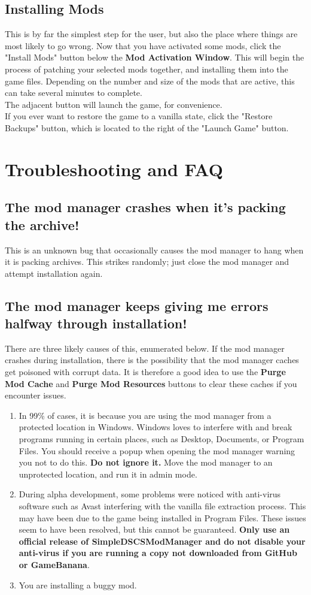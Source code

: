 \documentclass{article}
\begin{document}
\subsection{Installing Mods}
This is by far the simplest step for the user, but also the place where things are most likely to go wrong. Now that you have activated some mods, click the "Install Mods" button below the \textbf{Mod Activation Window}. This will begin the process of patching your selected mods together, and installing them into the game files. Depending on the number and size of the mods that are active, this can take several minutes to complete.\\
The adjacent button will launch the game, for convenience.\\
If you ever want to restore the game to a vanilla state, click the "Restore Backups" button, which is located to the right of the "Launch Game" button.

\newpage
\section{Troubleshooting and FAQ}
\subsection{The mod manager crashes when it's packing the archive!}
This is an unknown bug that occasionally causes the mod manager to hang when it is packing archives. This strikes randomly; just close the mod manager and attempt installation again.

\subsection{The mod manager keeps giving me errors halfway through installation!}
There are three likely causes of this, enumerated below. If the mod manager crashes during installation, there is the possibility that the mod manager caches get poisoned with corrupt data. It is therefore a good idea to use the \textbf{Purge Mod Cache} and \textbf{Purge Mod Resources} buttons to clear these caches if you encounter issues.
\begin{enumerate}
\item In 99\% of cases, it is because you are using the mod manager from a protected location in Windows. Windows loves to interfere with and break programs running in certain places, such as Desktop, Documents, or Program Files. You should receive a popup when opening the mod manager warning you not to do this. \textbf{Do not ignore it.} Move the mod manager to an unprotected location, and run it in admin mode.
\item During alpha development, some problems were noticed with anti-virus software such as Avast interfering with the vanilla file extraction process. This may have been due to the game being installed in Program Files. These issues seem to have been resolved, but this cannot be guaranteed. \textbf{Only use an official release of SimpleDSCSModManager and do not disable your anti-virus if you are running a copy not downloaded from GitHub or GameBanana}.
\item You are installing a buggy mod.
\end{enumerate}
\end{document}

